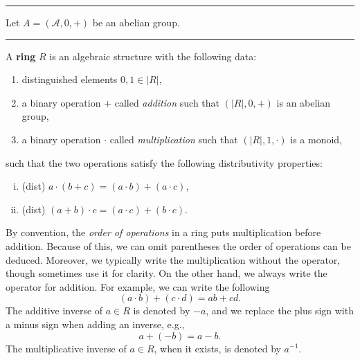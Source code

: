\documentclass[12pt]{article}
\newcommand{\keyword}[1]{\textbf{#1}}
\newcommand{\sepline}{\rule{\textwidth}{0.4pt}}
\theoremstyle{definition}
\renewcommand{\AA}{\mathcal{A}}
\newcommand{\<}{\left\langle}
\renewcommand{\>}{\right\rangle}
\begin{document}
\sepline

Let $A = (\AA, 0, +)$ be an abelian group.




\newpage
\sepline

A \keyword{ring} $R$ is an algebraic structure with the following data:
\begin{enumerate}[(1)]
    \item distinguished elements $0, 1 \in |R|$,
    \item a binary operation $+$ called \emph{addition} such that $(|R|, 0, +)$ is an abelian group,
    \item a binary operation $\cdot$ called \emph{multiplication} such that $(|R|, 1, \cdot)$ is a monoid,
\end{enumerate}
such that the two operations satisfy the following distributivity properties:
\begin{enumerate}[(i)]
    \item (dist) $a \cdot (b + c) = (a \cdot b) + (a \cdot c)$,
    \item (dist) $(a + b) \cdot c = (a \cdot c) + (b \cdot c)$.
\end{enumerate}

By convention, the \emph{order of operations} in a ring puts multiplication before addition.
Because of this, we can omit parentheses the order of operations can be deduced.
Moreover, we typically write the multiplication without the operator, though sometimes use it for clarity.
On the other hand, we always write the operator for addition.
For example, we can write the following
\[
    (a \cdot b) + (c \cdot d) = ab + cd.
\]
The additive inverse of $a \in R$ is denoted by $-a$, and we replace the plus sign with a minus sign when adding an inverse, e.g.,
\[
    a + (-b) = a - b.
\]
The multiplicative inverse of $a \in R$, when it exists, is denoted by $a^{-1}$.
\end{document}
